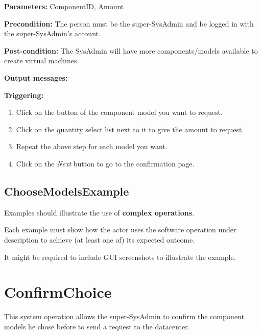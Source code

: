 \begin{description}

\item \textbf{Parameters:} ComponentID, Amount
\item \textbf{Precondition:} The person must be the super-SysAdmin and be logged
in with the super-SysAdmin's account.
\item \textbf{Post-condition:} The SysAdmin will have more components/models
available to create virtual machines.
\item \textbf{Output messages:}

\item \textbf{Triggering:}
\begin{enumerate}
\item Click on the button of the component model you want to request.
\item Click on the quantity select list next to it to give the amount to
request.
\item Repeat the above step for each model you want.
\item Click on the \emph{Next} button to go to the confirmation page.
\end{enumerate}

 
\end{description}

\subsection{ChooseModelsExample}
Examples should illustrate the use of \textbf{complex operations}.

Each example must show how the actor uses the software operation under
description to achieve (at least one of) its expected outcome.

It might be required to include GUI screenshots to illustrate the example.







\section{ConfirmChoice}
\label{operation:confirmchoice}
This system operation allows the super-SysAdmin to confirm the component models
he chose before to send a request to the datacenter.

